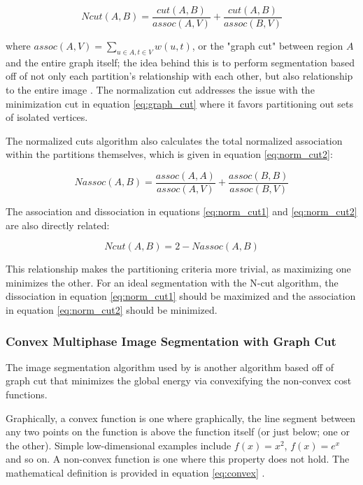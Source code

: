 \documentclass{article}
\begin{document}
\begin{equation}
Ncut(A,B) = \frac{cut(A,B)}{assoc(A,V)} + \frac{cut(A,B)}{assoc(B,V)}
\label{eq:norm_cut1}
\end{equation}

where $assoc(A,V) = \sum_{u\in A, t\in V} w(u,t)$, or the "graph cut" between region $A$ and the entire graph itself; the idea behind this is to perform segmentation based off of not only each partition's relationship with each other, but also relationship to the entire image \cite{ncut}. The normalization cut addresses the issue with the minimization cut in equation \ref{eq:graph_cut} where it favors partitioning out sets of isolated vertices.

The normalized cuts algorithm also calculates the total normalized association within the partitions themselves, which is given in equation \ref{eq:norm_cut2}: \cite{ncut}

\begin{equation}
Nassoc(A,B) = \frac{assoc(A,A)}{assoc(A,V)} + \frac{assoc(B,B)}{assoc(B,V)}
\label{eq:norm_cut2}
\end{equation}

The association and dissociation in equations \ref{eq:norm_cut1} and \ref{eq:norm_cut2} are also directly related: \cite{ncut}

\begin{equation}
Ncut(A,B) = 2 - Nassoc(A,B)
\end{equation}

This relationship makes the partitioning criteria more trivial, as maximizing one minimizes the other. For an ideal segmentation with the N-cut algorithm, the dissociation in equation \ref{eq:norm_cut1} should be maximized and the association in equation \ref{eq:norm_cut2} should be minimized.




\subsubsection*{Convex Multiphase Image Segmentation with Graph Cut}

The image segmentation algorithm used by \cite{jun} is another algorithm based off of graph cut that minimizes the global energy via convexifying the non-convex cost functions.

Graphically, a convex function is one where graphically, the line segment between any two points on the function is above the function itself (or just below; one or the other). Simple low-dimensional examples include $f(x)=x^2$, $f(x)=e^x$ and so on. A non-convex function is one where this property does not hold. The mathematical definition is provided in equation \ref{eq:convex} \cite{convex}.
\end{document}
